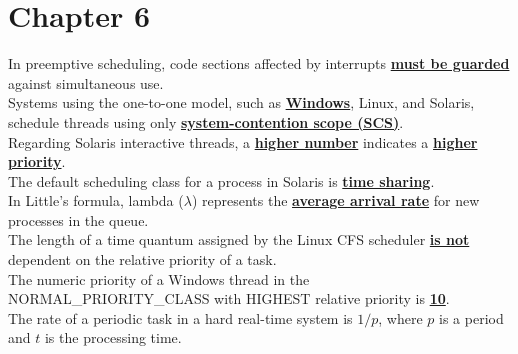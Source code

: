 \documentclass[10pt]{article}
\newcommand{\qw}[1]{\textbf{\ul{#1}}}
\begin{document}
\section*{\centering Chapter 6}
In preemptive scheduling, code sections affected by interrupts \qw{must be guarded} against simultaneous use.\\[2mm]
Systems using the one-to-one model, such as \qw{Windows}, Linux, and Solaris, schedule threads using only \qw{system-contention scope (SCS)}.\\[2mm]
Regarding Solaris interactive threads, a \qw{higher number} indicates a \qw{higher priority}.\\[2mm]
The default scheduling class for a process in Solaris is \qw{time sharing}.\\[2mm]
In Little's formula, lambda ($\lambda$) represents the \qw{average arrival rate} for new processes in the queue.\\[2mm]
The length of a time quantum assigned by the Linux CFS scheduler \qw{is not} dependent on the relative priority of a task.\\[2mm]
The numeric priority of a Windows thread in the NORMAL_PRIORITY_CLASS with HIGHEST relative priority is \qw{10}.\\[2mm]
The rate of a periodic task in a hard real-time system is \qw{$1/p$}, where $p$ is a period and $t$ is the processing time.\\[2mm]
\newpage
\end{document}
